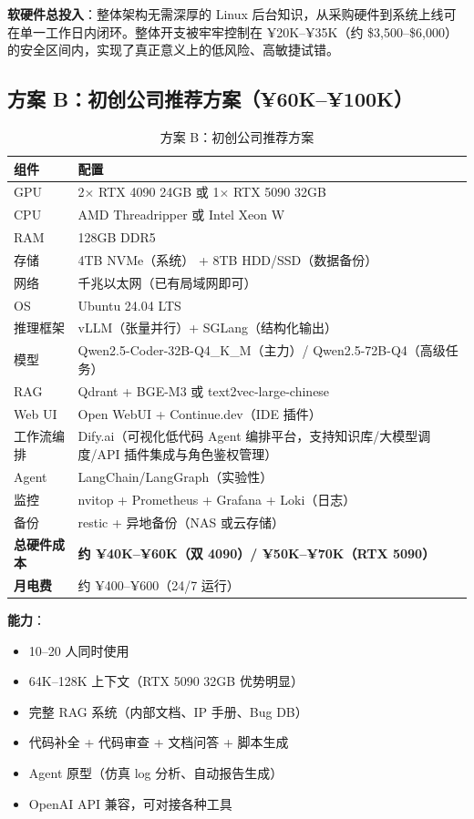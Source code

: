 \documentclass[UTF8,a4paper,10pt,oneside]{ctexart}
\begin{document}
\textbf{软硬件总投入}：整体架构无需深厚的 Linux 后台知识，从采购硬件到系统上线可在单一工作日内闭环。整体开支被牢牢控制在 ¥20K--¥35K（约 \$3,500--\$6,000）的安全区间内，实现了真正意义上的低风险、高敏捷试错。

\subsection{方案 B：初创公司推荐方案（¥60K--¥100K）}

\begin{table}[htbp]
\centering
\caption{方案 B：初创公司推荐方案}
\begin{tabular}{p{2cm}p{11cm}}
\hline
\textbf{组件} & \textbf{配置} \\
\hline
GPU & 2$\times$ RTX 4090 24GB 或 1$\times$ RTX 5090 32GB \\
CPU & AMD Threadripper 或 Intel Xeon W \\
RAM & 128GB DDR5 \\
存储 & 4TB NVMe（系统） + 8TB HDD/SSD（数据备份）\\
网络 & 千兆以太网（已有局域网即可）\\
OS & Ubuntu 24.04 LTS \\
推理框架 & vLLM（张量并行）+ SGLang（结构化输出）\\
模型 & Qwen2.5-Coder-32B-Q4\_K\_M（主力）/ Qwen2.5-72B-Q4（高级任务）\\
RAG & Qdrant + BGE-M3 或 text2vec-large-chinese \\
Web UI & Open WebUI + Continue.dev（IDE 插件）\\
工作流编排 & Dify.ai（可视化低代码 Agent 编排平台，支持知识库/大模型调度/API 插件集成与角色鉴权管理）\\
Agent & LangChain/LangGraph（实验性）\\
监控 & nvitop + Prometheus + Grafana + Loki（日志）\\
备份 & restic + 异地备份（NAS 或云存储）\\
\hline
\textbf{总硬件成本} & \textbf{约 ¥40K--¥60K（双 4090）/ ¥50K--¥70K（RTX 5090）} \\
\textbf{月电费} & 约 ¥400--¥600（24/7 运行）\\
\hline
\end{tabular}
\end{table}

\textbf{能力}：
\begin{itemize}
    \item 10--20 人同时使用
    \item 64K--128K 上下文（RTX 5090 32GB 优势明显）
    \item 完整 RAG 系统（内部文档、IP 手册、Bug DB）
    \item 代码补全 + 代码审查 + 文档问答 + 脚本生成
    \item Agent 原型（仿真 log 分析、自动报告生成）
    \item OpenAI API 兼容，可对接各种工具
\end{itemize}
\end{document}
